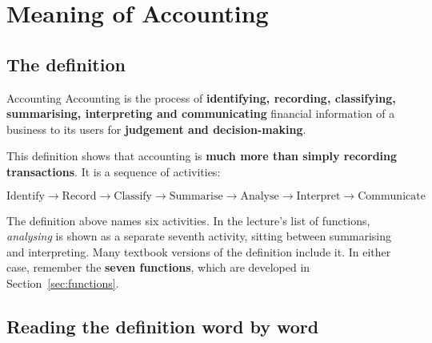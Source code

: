\documentclass[11pt,a4paper]{article}
\begin{document}
\section{Meaning of Accounting}

\subsection{The definition}

\begin{defbox}{Accounting}
Accounting is the process of \textbf{identifying, recording, classifying, summarising,
interpreting and communicating} financial information of a business to its users for
\textbf{judgement and decision-making}.
\end{defbox}

This definition shows that accounting is \textbf{much more than simply recording transactions}.
It is a sequence of activities:

\[
\boxed{\text{Identify}\rightarrow\text{Record}\rightarrow\text{Classify}\rightarrow\text{Summarise}\rightarrow\text{Analyse}\rightarrow\text{Interpret}\rightarrow\text{Communicate}}
\]

\begin{notebox}
The definition above names six activities. In the lecture's list of functions, \emph{analysing}
is shown as a separate seventh activity, sitting between summarising and interpreting. Many
textbook versions of the definition include it. In either case, remember the \textbf{seven
functions}, which are developed in Section~\ref{sec:functions}.
\end{notebox}

\subsection{Reading the definition word by word}
\end{document}
